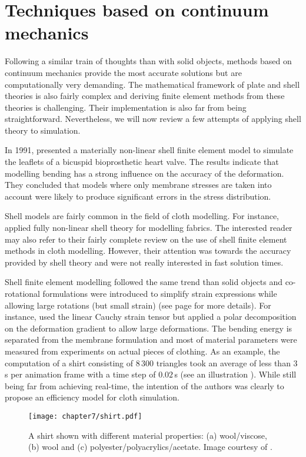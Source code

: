 \section{Techniques based on continuum mechanics}

Following a similar train of thoughts than with solid objects, methods based on continuum mechanics provide the most accurate solutions but are computationally very demanding. The mathematical framework of plate and shell theories is also fairly complex and deriving finite element methods from these theories is challenging. Their implementation is also far from being straightforward. Nevertheless, we will now review a few attempts of applying shell theory to simulation. 

In 1991, \citeauthor{Black91} presented a materially non-linear shell finite element model to simulate the leaflets of a bicuspid bioprosthetic heart valve. The results indicate that modelling bending has a strong influence on the accuracy of the deformation. They concluded that models where only membrane stresses are taken into account were likely to produce significant errors in the stress distribution. 

Shell models are fairly common in the field of cloth modelling. For instance, \cite{Eischen96} applied fully non-linear shell theory for modelling fabrics. The interested reader may also refer to their fairly complete review on the use of shell finite element methods in cloth modelling. However, their attention was towards the accuracy provided by shell theory and were not really interested in fast solution times. 

Shell finite element modelling followed the same trend than solid objects and co-rotational formulations were introduced to simplify strain expressions while allowing large rotations (but small strain) (see page \pageref{chap4:corotationalMethods} for more details). For instance, \cite{Etzmuss03} used the linear Cauchy strain tensor but applied a polar decomposition on the deformation gradient to allow large deformations. The bending energy is separated from the membrane formulation and most of material parameters were measured from experiments on actual pieces of clothing. As an example, the computation of a shirt consisting of $ 8\,300 $ triangles took an average of less than $ 3\,$s per animation frame with a time step of $ 0.02\,$s (see an illustration ). While still being far from achieving real-time, the intention of the authors was clearly to propose an efficiency model for cloth simulation. 
%
\begin{figure}[ht]
\begin{center}
\texttt{[image: chapter7/shirt.pdf]}
\caption[A shirt shown with different material properties]{A shirt shown with different material properties: (a) wool/viscose, (b) wool and (c) polyester/polyacrylics/acetate. Image courtesy of \cite{Etzmuss03}.}
\label{chap7:fig-shirt}
\end{center}
\end{figure}

